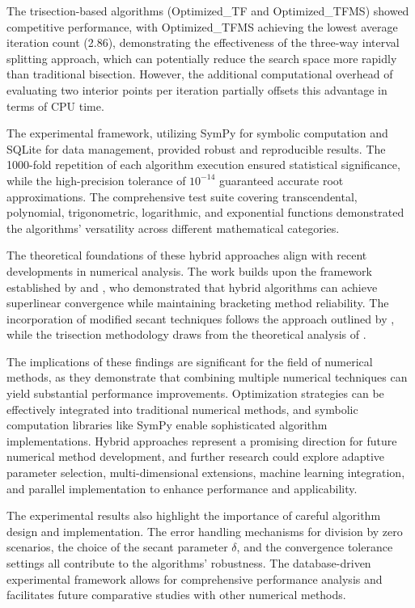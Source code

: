 \documentclass[amsmath, amssymb, aps]{revtex4-2}
\begin{document}
The trisection-based algorithms (Optimized\_TF and Optimized\_TFMS) showed competitive performance, with Optimized\_TFMS achieving the lowest average iteration count (2.86), demonstrating the effectiveness of the three-way interval splitting approach, which can potentially reduce the search space more rapidly than traditional bisection. However, the additional computational overhead of evaluating two interior points per iteration partially offsets this advantage in terms of CPU time.

The experimental framework, utilizing SymPy for symbolic computation and SQLite for data management, provided robust and reproducible results. The 1000-fold repetition of each algorithm execution ensured statistical significance, while the high-precision tolerance of $10^{-14}$ guaranteed accurate root approximations. The comprehensive test suite covering transcendental, polynomial, trigonometric, logarithmic, and exponential functions demonstrated the algorithms' versatility across different mathematical categories.

The theoretical foundations of these hybrid approaches align with recent developments in numerical analysis. The work builds upon the framework established by \cite{sabharwal2019blended} and \cite{badr2022novel}, who demonstrated that hybrid algorithms can achieve superlinear convergence while maintaining bracketing method reliability. The incorporation of modified secant techniques follows the approach outlined by \cite{mathews2004numerical}, while the trisection methodology draws from the theoretical analysis of \cite{demir2008trisection}.

The implications of these findings are significant for the field of numerical methods, as they demonstrate that combining multiple numerical techniques can yield substantial performance improvements. Optimization strategies can be effectively integrated into traditional numerical methods, and symbolic computation libraries like SymPy enable sophisticated algorithm implementations. Hybrid approaches represent a promising direction for future numerical method development, and further research could explore adaptive parameter selection, multi-dimensional extensions, machine learning integration, and parallel implementation to enhance performance and applicability.

The experimental results also highlight the importance of careful algorithm design and implementation. The error handling mechanisms for division by zero scenarios, the choice of the secant parameter $\delta$, and the convergence tolerance settings all contribute to the algorithms' robustness. The database-driven experimental framework allows for comprehensive performance analysis and facilitates future comparative studies with other numerical methods.
\end{document}
